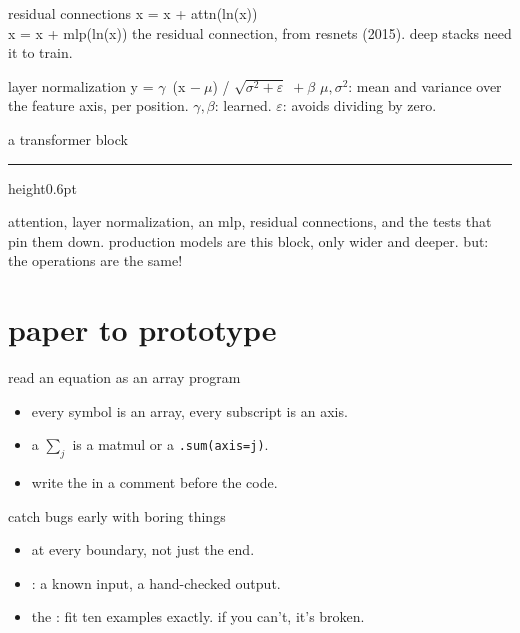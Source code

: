   \begin{frame}{residual connections}
      {x = x + attn(ln(x)) \\[0.4em] x = x + mlp(ln(x))}
      {the residual connection, from resnets (2015). deep stacks need it to train.}
  \end{frame}

  \begin{frame}{layer normalization}
      {y = $\gamma$ \,(x $-\ \mu$) / $\sqrt{\sigma^2 + \varepsilon}$\, $+\ \beta$}
      {$\mu, \sigma^2$: mean and variance over the feature axis, per position.
       $\gamma, \beta$: learned. $\varepsilon$: avoids dividing by zero.}
  \end{frame}


  \begin{frame}[t]{a transformer block}
    \paperheight
    \paperheight
    {\color{cwRule}\hrule height0.6pt}\vskip10pt
    {\cwhankenbody\color{cwFaint}\small attention, layer normalization, an mlp,
		residual connections, and the tests that pin them down. production models
		are this block, only wider and deeper. but: the operations are the same!}
  \end{frame}

  \section{paper to prototype}
  \begin{frame}{read an equation as an array program}
    \begin{itemize}
      \item every symbol is an array, every subscript is an axis.
      \item a $\sum_j$ is a matmul or a \texttt{.sum(axis=j)}.
      \item write the  in a comment before the code.
    \end{itemize}
  \end{frame}

  \begin{frame}{catch bugs early with boring things}
    \begin{itemize}
      \item {} at every boundary, not just the end.
      \item {}: a known input, a hand-checked output.
      \item the : fit ten examples exactly. if you can't, it's broken.
    \end{itemize}
  \end{frame}


